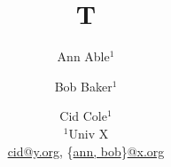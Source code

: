 \documentclass{article}
\begin{document}
\title{T}
\author{Ann Able$^1$ \and Bob Baker$^1$ \and Cid Cole$^1$\\
$^1$Univ X\\
\url{cid@y.org}, \{\url{ann, bob}\}\url{@x.org}}
\maketitle
\end{document}
